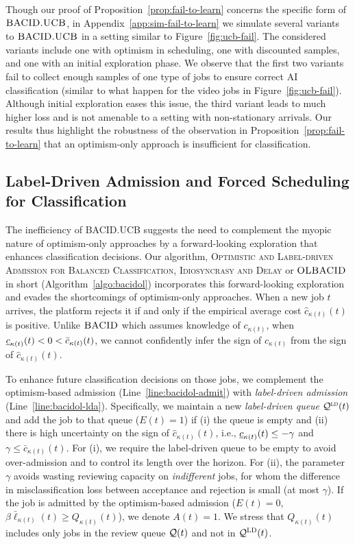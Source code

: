 Though our proof of Proposition~\ref{prop:fail-to-learn} concerns the specific form of $\textsc{BACID.UCB}$, in Appendix~\ref{app:sim-fail-to-learn} we simulate several variants to $\textsc{BACID.UCB}$ in a setting similar to Figure~\ref{fig:ucb-fail}. The considered variants  include one with optimism in scheduling, one with discounted samples, and one with an initial exploration phase. We observe that the first two variants fail to collect enough samples of one type of jobs to ensure correct AI classification (similar to what happen for the video jobs in Figure~\ref{fig:ucb-fail}). Although initial exploration eases this issue, the third variant  leads to much higher loss and is not amenable to a setting with non-stationary arrivals. Our results thus highlight the robustness of the observation in Proposition~\ref{prop:fail-to-learn} that an optimism-only approach is insufficient for classification.

\subsection{Label-Driven Admission and Forced Scheduling for Classification}
The inefficiency of \textsc{BACID.UCB} suggests the need to complement the myopic nature of optimism-only approaches by a forward-looking exploration that enhances classification decisions. Our algorithm, \textsc{Optimistic and Label-driven Admission for Balanced Classification, Idiosyncrasy and Delay} or $\textsc{OLBACID}$ in short (Algorithm~\ref{algo:bacidol}) incorporates this forward-looking exploration and evades the shortcomings of optimism-only approaches. When a new job $t$ arrives, the platform rejects it if and only if the empirical average cost $\hat{c}_{\kappa(t)}(t)$ is positive. Unlike $\textsc{BACID}$ which assumes knowledge of $c_{\kappa(t)}$, when $\underline{c}_{\kappa(t)}(t) < 0 < \bar{c}_{\kappa(t)}(t)$, we cannot confidently infer the sign of $c_{\kappa(t)}$ from the sign of $\hat{c}_{\kappa(t)}(t)$. 

To enhance future classification decisions on those jobs, we complement the optimism-based admission (Line~\ref{line:bacidol-admit}) with \emph{label-driven admission} (Line~\ref{line:bacidol-lda}). Specifically, we maintain a new \emph{label-driven queue} $\mathcal{Q}^{\textsc{ld}}(t)$ and add the job to that queue ($E(t) = 1$) if (i) the queue is empty and (ii) there is high uncertainty on the sign of $\hat{c}_{\kappa(t)}(t)$, i.e., $\underline{c}_{\kappa(t)}(t) \leq -\gamma$ and $\gamma \leq \bar{c}_{\kappa(t)}(t)$. For (i), we require the label-driven queue to be empty to avoid over-admission and to control its length over the horizon. For (ii), the parameter $\gamma$ avoids wasting reviewing capacity on \emph{indifferent} jobs,  for whom the difference in misclassification loss between acceptance and rejection is small (at most $\gamma$). If the job is admitted by the optimism-based admission ($E(t) = 0$, $\beta\bar{\ell}_{\kappa(t)}(t) \geq Q_{\kappa(t)}(t)$), we denote $A(t) = 1$. We stress that $Q_{\kappa(t)}(t)$ includes only jobs in the review queue $\mathcal{Q}(t)$ and not in $\mathcal{Q}^{\mathcal{\textsc{LD}}}(t)$. 


